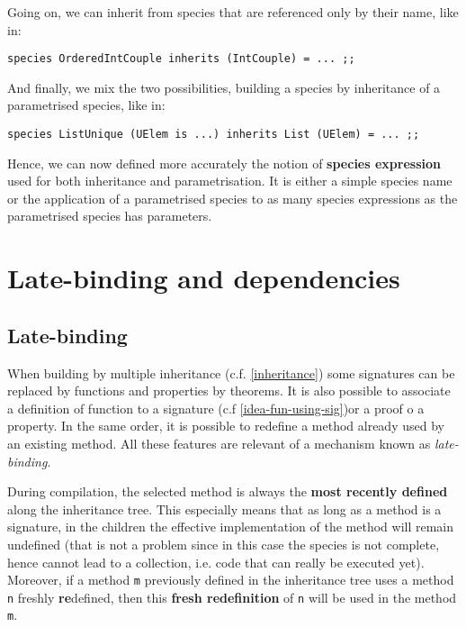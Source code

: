Going on, we can  inherit
from species that are referenced only by their name, like in:
{\scriptsize
\begin{lstlisting}
species OrderedIntCouple inherits (IntCouple) = ... ;;
\end{lstlisting}
}

And finally, we mix the two possibilities, building a species by
inheritance of a parametrised species, like in: {\scriptsize
\begin{lstlisting}
species ListUnique (UElem is ...) inherits List (UElem) = ... ;;
\end{lstlisting}
}

Hence, we can now defined more accurately the notion of {\bf species
expression} used for both inheritance and parametrisation. It is either
a simple species name or the application of a parametrised species to
as many species expressions as the parametrised species has
parameters.


\section{Late-binding and dependencies}

\subsection{Late-binding}
\label{late-binding}
 When building by multiple inheritance
(c.f. \ref{inheritance}) some signatures can be replaced by functions
and properties by theorems. It is also possible to associate a
definition of function to a signature (c.f \ref{idea-fun-using-sig})or
a proof o a property. In the same order, it is possible to redefine a
method already used by an existing method.
All these features are relevant of a mechanism known as {\em
  late-binding}. 


During compilation, the selected method is always the {\bf most
recently defined} along the inheritance tree. This especially means
that as long as a method is a signature, in the children the effective
implementation of the method will remain undefined (that is not a
problem since in this case the species is not complete, hence cannot
lead to a collection, i.e. code that can really be executed
yet). Moreover, if a method {\tt m} previously defined in the
inheritance tree uses a method {\tt n} freshly {\bf re}defined, then
this {\bf fresh redefinition} of {\tt n} will be used in the method
{\tt m}.

